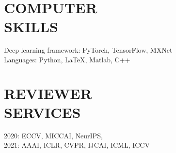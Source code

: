 \documentclass[margin]{res}
\begin{document}
\begin{resume}
\vspace{-1em}
\section{COMPUTER \\ SKILLS} 
                Deep learning framework: PyTorch, TensorFlow, MXNet\\
                Languages: Python, \LaTeX, Matlab, C++

\vspace{-1em}
\section{REVIEWER \\ SERVICES}
                2020: ECCV, MICCAI, NeurIPS,\\ 2021: AAAI, ICLR, CVPR, IJCAI, ICML, ICCV

\end{resume}
\end{document}
